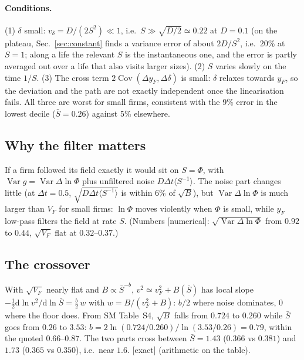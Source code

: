 \documentclass[11pt]{article}
\newcommand{\Var}{\operatorname{Var}}
\newcommand{\Cov}{\operatorname{Cov}}
\newcommand{\Sb}{\bar S}
\newcommand{\dd}{\mathrm d}
\newcommand{\exact}{\textsf{\small[exact]}}
\newcommand{\numer}{\textsf{\small[numerical]}}
\begin{document}
\paragraph{Conditions.}  (1) $\delta$ small: $v_\delta=D/(2S^2)\ll1$, i.e.\ $S\gg\sqrt{D/2}\simeq0.22$ at $D=0.1$ (on the plateau, Sec.~\ref{sec:constant}
finds a variance error of about $2D/S^2$, i.e.\ $20\%$ at $S=1$; along a life the relevant $S$ is the instantaneous one, and
the error is partly averaged out over a life that also visits larger sizes).  (2) $S$ varies slowly on the time $1/S$.  (3) The cross term $2\Cov(\Delta y_F,\Delta\delta)$ is small: $\delta$
relaxes towards $y_F$, so the deviation and the path are not exactly independent once the linearisation fails.  All three are
worst for small firms, consistent with the 9\% error in the lowest decile ($\Sb=0.26$) against 5\% elsewhere.

\subsection{Why the filter matters}

If a firm followed its field exactly it would sit on $S=\Phi$, with $\Var g=\Var\Delta\ln\Phi$ plus unfiltered noise
$D\Delta t\langle S^{-1}\rangle$.  The noise part changes little (at $\Delta t=0.5$, $\sqrt{D\Delta t\langle S^{-1}\rangle}$ is within 6\% of $\sqrt B$),
but $\Var\Delta\ln\Phi$ is much larger than $V_F$ for small firms: $\ln\Phi$ moves violently when $\Phi$ is small, while $y_F$
low-pass filters the field at rate $S$.  (Numbers \numer: $\sqrt{\Var\Delta\ln\Phi}$ from $0.92$ to $0.44$, $\sqrt{V_F}$ flat at $0.32$--$0.37$.)

\subsection{The crossover}

With $\sqrt{V_F}$ nearly flat and $B\propto\Sb^{-b}$, $v^2\simeq v_F^2+B(\Sb)$ has local slope
$-\tfrac12\dd\ln v^2/\dd\ln\Sb=\tfrac b2\,w$ with $w=B/(v_F^2+B)$: $b/2$ where noise dominates, $0$ where the floor does.  From SM
Table~S4, $\sqrt B$ falls from $0.724$ to $0.260$ while $\Sb$ goes from $0.26$ to $3.53$: $b=2\ln(0.724/0.260)/\ln(3.53/0.26)=0.79$,
within the quoted $0.66$--$0.87$.  The two parts cross between $\Sb=1.43$ ($0.366$ vs $0.381$) and $1.73$ ($0.365$ vs $0.350$), i.e.\
near $1.6$.  \exact{} (arithmetic on the table).

\end{document}
